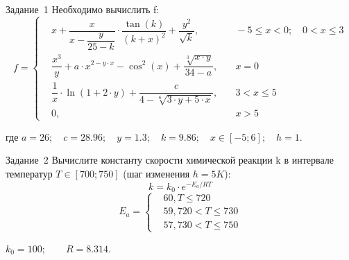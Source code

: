 \documentclass[aspectratio=169, mathserif]{beamer}	%
\begin{document}
\begin{frame}[fragile]{Задание~1}
\large
Необходимо вычислить f:
\begin{equation*}
f = \left\{ 
\begin{aligned}
	& x + \dfrac{x}{x - \dfrac{y}{25 - k}} \cdot \dfrac{\tan \left(k\right)}{\left(k + x\right)^2} + \dfrac{y^2}{\sqrt{k}}, &\quad -5 \leqslant x < 0; \quad 0 < x \leqslant 3 \\
	& \dfrac{x^3}{y} + a \cdot x ^ {2 - y \cdot x} - \cos^2\left(x\right) + \dfrac{\sqrt[3]{x \cdot y}}{34 - a}, &\quad x = 0 \\
	& \dfrac{1}{x} \cdot \ln \left(1 + 2 \cdot y\right) + \dfrac{c}{4 - \sqrt[6]{3 \cdot y + 5 \cdot x}}, &\quad  3 < x \leqslant 5 \\
	& 0, &\quad x > 5
\end{aligned}	
\right.
\end{equation*}

где \quad $a = 26; \quad c = 28.96; \quad y = 1.3; \quad k = 9.86; \quad x \in \left[-5; 6\right]; \quad h = 1$.
\vfill
\end{frame}


\begin{frame}[fragile]{Задание~2}
\large
Вычислите константу скорости химической реакции k в интервале температур $T \in \left[700; 750\right]$ (шаг изменения $h = 5 K$):
\begin{equation*}
	k = k_0 \cdot e^{-E_a / RT}
\end{equation*}
\begin{equation*}
	E_a = \left\{
	\begin{aligned}
		& 60, T \leqslant 720 \\
		& 59, 720 < T \leqslant 730 \\
		& 57, 730 < T \leqslant 750
	\end{aligned}
	\right.
\end{equation*}

$k_0 = 100; \qquad R = 8.314$.
\vfill
\end{frame}
\end{document}
